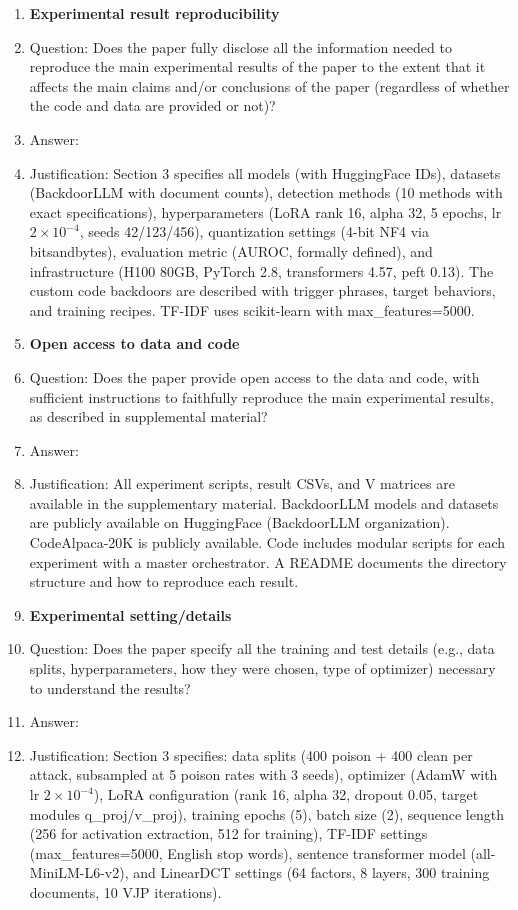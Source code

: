 \begin{enumerate}
    \item {\bf Experimental result reproducibility}
    \item[] Question: Does the paper fully disclose all the information needed to reproduce the main experimental results of the paper to the extent that it affects the main claims and/or conclusions of the paper (regardless of whether the code and data are provided or not)?
    \item[] Answer: \answerYes{}
    \item[] Justification: Section 3 specifies all models (with HuggingFace IDs), datasets (BackdoorLLM with document counts), detection methods (10 methods with exact specifications), hyperparameters (LoRA rank 16, alpha 32, 5 epochs, lr $2 \times 10^{-4}$, seeds 42/123/456), quantization settings (4-bit NF4 via bitsandbytes), evaluation metric (AUROC, formally defined), and infrastructure (H100 80GB, PyTorch 2.8, transformers 4.57, peft 0.13). The custom code backdoors are described with trigger phrases, target behaviors, and training recipes. TF-IDF uses scikit-learn with max\_features=5000.

\item {\bf Open access to data and code}
    \item[] Question: Does the paper provide open access to the data and code, with sufficient instructions to faithfully reproduce the main experimental results, as described in supplemental material?
    \item[] Answer: \answerYes{}
    \item[] Justification: All experiment scripts, result CSVs, and V matrices are available in the supplementary material. BackdoorLLM models and datasets are publicly available on HuggingFace (BackdoorLLM organization). CodeAlpaca-20K is publicly available. Code includes modular scripts for each experiment with a master orchestrator. A README documents the directory structure and how to reproduce each result.

\item {\bf Experimental setting/details}
    \item[] Question: Does the paper specify all the training and test details (e.g., data splits, hyperparameters, how they were chosen, type of optimizer) necessary to understand the results?
    \item[] Answer: \answerYes{}
    \item[] Justification: Section 3 specifies: data splits (400 poison + 400 clean per attack, subsampled at 5 poison rates with 3 seeds), optimizer (AdamW with lr $2 \times 10^{-4}$), LoRA configuration (rank 16, alpha 32, dropout 0.05, target modules q\_proj/v\_proj), training epochs (5), batch size (2), sequence length (256 for activation extraction, 512 for training), TF-IDF settings (max\_features=5000, English stop words), sentence transformer model (all-MiniLM-L6-v2), and LinearDCT settings (64 factors, 8 layers, 300 training documents, 10 VJP iterations).


\end{enumerate}
